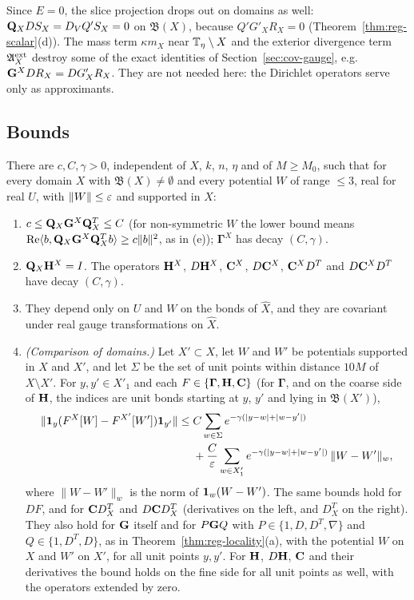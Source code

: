 Since $E=0$, the slice projection drops out on domains as well: $\mathbf Q_XDS_X=D_VQ'S_X=0$ on $\mathfrak B(X)$, because $Q'G'_XR_X=0$ (Theorem~\ref{thm:reg-scalar}(d)). The mass term $\kappa m_X$ near $\mathbb T_\eta\setminus X$ and the exterior divergence term $\mathfrak A^{\rm ext}_X$ destroy some of the exact identities of Section~\ref{sec:cov-gauge}, e.g.\ $\mathbf G^XDR_X=DG'_XR_X$. They are not needed here: the Dirichlet operators serve only as approximants.

\subsection{Bounds}

\begin{proposition}\label{prop:dirichlet-averaged}
There are $c,C,\gamma>0$, independent of $X$, $k$, $n$, $\eta$ and of $M\ge M_0$, such that for every domain $X$ with $\mathfrak B(X)\ne\emptyset$ and every potential $W$ of range $\le3$, real for real $U$, with $\|W\|\le\varepsilon$ and supported in $X$:
\begin{enumerate}[label=(\alph*)]
\item $c\le\mathbf Q_X\mathbf G^X\mathbf Q_X^T\le C$ (for non-symmetric $W$ the lower bound means $\operatorname{Re}\langle b,\mathbf Q_X\mathbf G^X\mathbf Q_X^Tb\rangle\ge c\|b\|^2$, as in (e)); $\boldsymbol\Gamma^X$ has decay $(C,\gamma)$.
\item $\mathbf Q_X\mathbf H^X=I$. The operators $\mathbf H^X$, $D\mathbf H^X$, $\mathbf C^X$, $D\mathbf C^X$, $\mathbf C^XD^T$ and $D\mathbf C^XD^T$ have decay $(C,\gamma)$.
\item They depend only on $U$ and $W$ on the bonds of $\hat X$, and they are covariant under real gauge transformations on $\hat X$.
\item \emph{(Comparison of domains.)} Let $X'\subset X$, let $W$ and $W'$ be potentials supported in $X$ and $X'$, and let $\Sigma$ be the set of unit points within distance $10M$ of $X\setminus X'$. For $y,y'\in X'_1$ and each $F\in\{\boldsymbol\Gamma,\mathbf H,\mathbf C\}$ (for $\boldsymbol\Gamma$, and on the coarse side of $\mathbf H$, the indices are unit bonds starting at $y$, $y'$ and lying in $\mathfrak B(X')$),
\[
\begin{aligned}
\|\mathbf 1_y(F^X[W]-F^{X'}[W'])\mathbf 1_{y'}\|\le{}&C\sum_{w\in\Sigma}e^{-\gamma(|y-w|+|w-y'|)}\\
&+\frac C{\varepsilon}\sum_{w\in X'_1}e^{-\gamma(|y-w|+|w-y'|)}\,\|W-W'\|_w ,
\end{aligned}
\]
where $\|W-W'\|_w$ is the norm of $\mathbf 1_w(W-W')$. The same bounds hold for $DF$, and for $\mathbf C D^T_X$ and $D\mathbf C D^T_X$ (derivatives on the left, and $D^T_X$ on the right). They also hold for $\mathbf G$ itself and for $P\mathbf G Q$ with $P\in\{1,D,D^T,\nabla\}$ and $Q\in\{1,D^T,D\}$, as in Theorem~\ref{thm:reg-locality}(a), with the potential $W$ on $X$ and $W'$ on $X'$, for all unit points $y,y'$. For $\mathbf H$, $D\mathbf H$, $\mathbf C$ and their derivatives the bound holds on the fine side for all unit points as well, with the operators extended by zero.

\end{enumerate}
\end{proposition}
